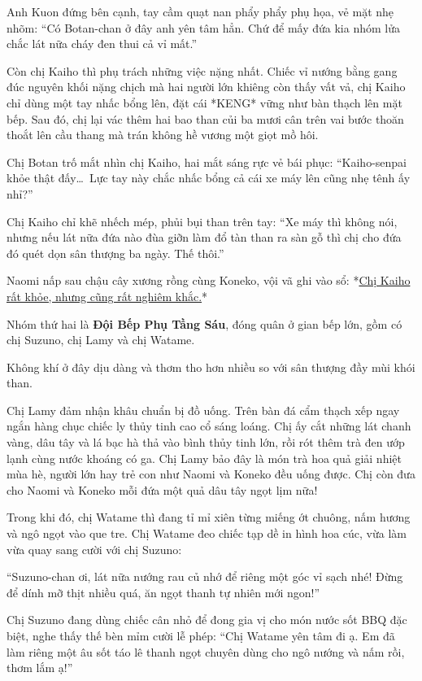 \documentclass[../main.tex]{subfiles}
\begin{document}
Anh Kuon đứng bên cạnh, tay cầm quạt nan phẩy phẩy phụ họa, vẻ mặt nhẹ nhõm: ``Có Botan-chan ở đây anh yên tâm hẳn. Chứ để mấy đứa kia nhóm lửa chắc lát nữa cháy đen thui cả vỉ mất.''

Còn chị Kaiho thì phụ trách những việc nặng nhất. Chiếc vỉ nướng bằng gang đúc nguyên khối nặng chịch mà hai người lớn khiêng còn thấy vất vả, chị Kaiho chỉ dùng một tay nhấc bổng lên, đặt cái *KENG* vững như bàn thạch lên mặt bếp. Sau đó, chị lại vác thêm hai bao than củi ba mươi cân trên vai bước thoăn thoắt lên cầu thang mà trán không hề vương một giọt mồ hôi.

Chị Botan trố mắt nhìn chị Kaiho, hai mắt sáng rực vẻ bái phục: ``Kaiho-senpai khỏe thật đấy\dots\ Lực tay này chắc nhấc bổng cả cái xe máy lên cũng nhẹ tênh ấy nhỉ?''

Chị Kaiho chỉ khẽ nhếch mép, phủi bụi than trên tay: ``Xe máy thì không nói, nhưng nếu lát nữa đứa nào đùa giỡn làm đổ tàn than ra sàn gỗ thì chị cho đứa đó quét dọn sân thượng ba ngày. Thế thôi.''

Naomi nấp sau chậu cây xương rồng cùng Koneko, vội vã ghi vào sổ: *\uline{Chị Kaiho rất khỏe, nhưng cũng rất nghiêm khắc.}*

\ct

Nhóm thứ hai là \textbf{Đội Bếp Phụ Tầng Sáu}, đóng quân ở gian bếp lớn, gồm có chị Suzuno, chị Lamy và chị Watame.

Không khí ở đây dịu dàng và thơm tho hơn nhiều so với sân thượng đầy mùi khói than.

Chị Lamy đảm nhận khâu chuẩn bị đồ uống. Trên bàn đá cẩm thạch xếp ngay ngắn hàng chục chiếc ly thủy tinh cao cổ sáng loáng. Chị ấy cắt những lát chanh vàng, dâu tây và lá bạc hà thả vào bình thủy tinh lớn, rồi rót thêm trà đen ướp lạnh cùng nước khoáng có ga. Chị Lamy bảo đây là món trà hoa quả giải nhiệt mùa hè, người lớn hay trẻ con như Naomi và Koneko đều uống được. Chị còn đưa cho Naomi và Koneko mỗi đứa một quả dâu tây ngọt lịm nữa!

Trong khi đó, chị Watame thì đang tỉ mỉ xiên từng miếng ớt chuông, nấm hương và ngô ngọt vào que tre. Chị Watame đeo chiếc tạp dề in hình hoa cúc, vừa làm vừa quay sang cười với chị Suzuno:

``Suzuno-chan ơi, lát nữa nướng rau củ nhớ để riêng một góc vỉ sạch nhé! Đừng để dính mỡ thịt nhiều quá, ăn ngọt thanh tự nhiên mới ngon!''

Chị Suzuno đang dùng chiếc cân nhỏ để đong gia vị cho món nước sốt BBQ đặc biệt, nghe thấy thế bèn mỉm cười lễ phép: ``Chị Watame yên tâm đi ạ. Em đã làm riêng một âu sốt táo lê thanh ngọt chuyên dùng cho ngô nướng và nấm rồi, thơm lắm ạ!''
\end{document}
